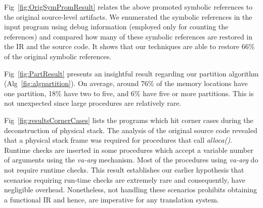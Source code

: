 


Fig~\ref{fig:OrigSymPromResult} relates the above promoted symbolic references to the original source-level artifacts. We enumerated the symbolic references in the input program using debug information (employed only for counting the references) and compared how many of these symbolic references are restored in the IR and the source code. It shows that our techniques are able to restore 66\% of the original symbolic references.

Fig~\ref{fig:PartResult} presents an insightful result regarding our partition algorithm (Alg~\ref{fig:algpartition}). On average, around 76\% of the memory locations have one partition, 18\% have two to five, and 6\% have five or more partitions. This is not unexpected since large procedures are relatively rare.

%
Fig~\ref{fig:resultsCornerCases} lists the programs which hit corner cases during the deconstruction of physical stack. The analysis of the original source code revealed that a physical stack frame was required for procedures that call \emph{alloca()}. Runtime checks are inserted in some procedures which accept a variable number of arguments using the \emph{va-arg} mechanism. Most of the procedures using \emph{va-arg} do not require runtime checks. This result establishes our earlier hypothesis that scenarios requiring run-time checks are extremely rare and consequently, have negligible overhead. Nonetheless, not handling these scenarios prohibits obtaining a functional IR and hence, are imperative for any translation system.

